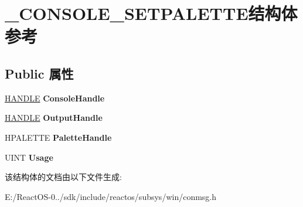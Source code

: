 \hypertarget{struct___c_o_n_s_o_l_e___s_e_t_p_a_l_e_t_t_e}{}\section{\+\_\+\+C\+O\+N\+S\+O\+L\+E\+\_\+\+S\+E\+T\+P\+A\+L\+E\+T\+T\+E结构体 参考}
\label{struct___c_o_n_s_o_l_e___s_e_t_p_a_l_e_t_t_e}
\subsection*{Public 属性}
\begin{DoxyCompactItemize}
\item 
\mbox{\label{struct___c_o_n_s_o_l_e___s_e_t_p_a_l_e_t_t_e_a9554346b486b632d6ac381d2bef28901}} 
\hyperlink{interfacevoid}{H\+A\+N\+D\+LE} {\bfseries Console\+Handle}
\item 
\mbox{\label{struct___c_o_n_s_o_l_e___s_e_t_p_a_l_e_t_t_e_a89929687392c3c0b129cdabcc5828462}} 
\hyperlink{interfacevoid}{H\+A\+N\+D\+LE} {\bfseries Output\+Handle}
\item 
\mbox{\label{struct___c_o_n_s_o_l_e___s_e_t_p_a_l_e_t_t_e_af836ccf9d1a647876711b2327502f5c2}} 
H\+P\+A\+L\+E\+T\+TE {\bfseries Palette\+Handle}
\item 
\mbox{\label{struct___c_o_n_s_o_l_e___s_e_t_p_a_l_e_t_t_e_ad148506ab216c89edbe217464d34592a}} 
U\+I\+NT {\bfseries Usage}
\end{DoxyCompactItemize}


该结构体的文档由以下文件生成\+:\begin{DoxyCompactItemize}
\item 
E\+:/\+React\+O\+S-\/0../sdk/include/reactos/subsys/win/conmsg.\+h\end{DoxyCompactItemize}
